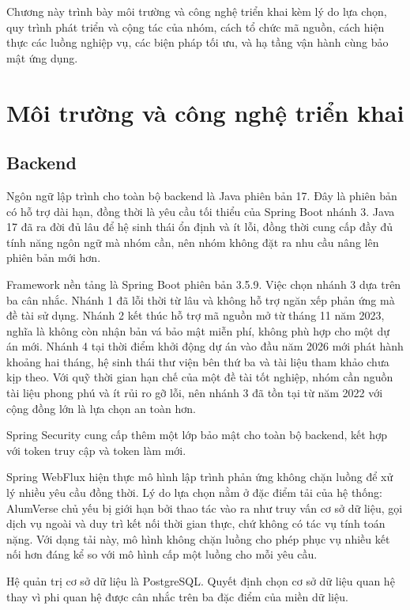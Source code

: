 \documentclass[12pt,a4paper,oneside]{report}
\begin{document}
Chương này trình bày môi trường và công nghệ triển khai kèm lý do lựa chọn, quy trình phát triển và cộng tác của nhóm, cách tổ chức mã nguồn, cách hiện thực các luồng nghiệp vụ, các biện pháp tối ưu, và hạ tầng vận hành cùng bảo mật ứng dụng.

\section{Môi trường và công nghệ triển khai}

\subsection{Backend}

Ngôn ngữ lập trình cho toàn bộ backend là Java phiên bản 17. Đây là phiên bản có hỗ trợ dài hạn, đồng thời là yêu cầu tối thiểu của Spring Boot nhánh 3. Java 17 đã ra đời đủ lâu để hệ sinh thái ổn định và ít lỗi, đồng thời cung cấp đầy đủ tính năng ngôn ngữ mà nhóm cần, nên nhóm không đặt ra nhu cầu nâng lên phiên bản mới hơn.

Framework nền tảng là Spring Boot phiên bản 3.5.9. Việc chọn nhánh 3 dựa trên ba cân nhắc. Nhánh 1 đã lỗi thời từ lâu và không hỗ trợ ngăn xếp phản ứng mà đề tài sử dụng. Nhánh 2 kết thúc hỗ trợ mã nguồn mở từ tháng 11 năm 2023, nghĩa là không còn nhận bản vá bảo mật miễn phí, không phù hợp cho một dự án mới. Nhánh 4 tại thời điểm khởi động dự án vào đầu năm 2026 mới phát hành khoảng hai tháng, hệ sinh thái thư viện bên thứ ba và tài liệu tham khảo chưa kịp theo. Với quỹ thời gian hạn chế của một đề tài tốt nghiệp, nhóm cần nguồn tài liệu phong phú và ít rủi ro gỡ lỗi, nên nhánh 3 đã tồn tại từ năm 2022 với cộng đồng lớn là lựa chọn an toàn hơn.

Spring Security cung cấp thêm một lớp bảo mật cho toàn bộ backend, kết hợp với token truy cập và token làm mới.

Spring WebFlux hiện thực mô hình lập trình phản ứng không chặn luồng để xử lý nhiều yêu cầu đồng thời. Lý do lựa chọn nằm ở đặc điểm tải của hệ thống: AlumVerse chủ yếu bị giới hạn bởi thao tác vào ra như truy vấn cơ sở dữ liệu, gọi dịch vụ ngoài và duy trì kết nối thời gian thực, chứ không có tác vụ tính toán nặng. Với dạng tải này, mô hình không chặn luồng cho phép phục vụ nhiều kết nối hơn đáng kể so với mô hình cấp một luồng cho mỗi yêu cầu.

Hệ quản trị cơ sở dữ liệu là PostgreSQL. Quyết định chọn cơ sở dữ liệu quan hệ thay vì phi quan hệ được cân nhắc trên ba đặc điểm của miền dữ liệu.
\end{document}
